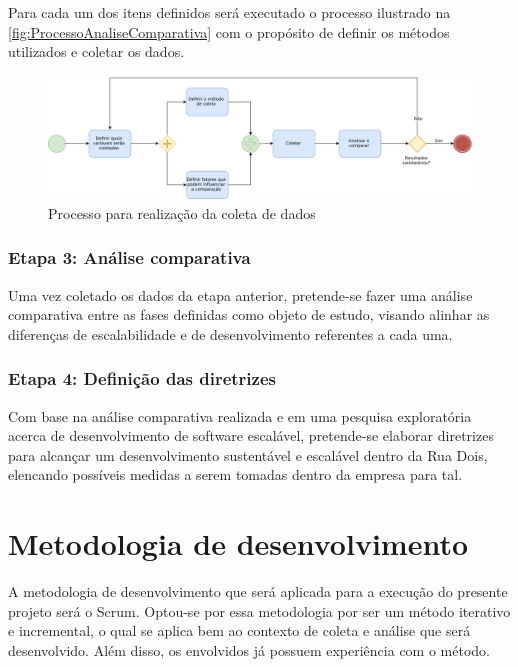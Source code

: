 Para cada um dos itens definidos será executado o processo ilustrado na
\autoref{fig:ProcessoAnaliseComparativa} com o propósito de definir os métodos utilizados
e coletar os dados.

    \begin{figure}[h]
      \caption{Processo para realização da coleta de dados\label{fig:ProcessoAnaliseComparativa}}
      \centering
      \includegraphics[keepaspectratio=true,scale=0.5]{figuras/metodologiaAnalise.eps}
    \end{figure}

\subsubsection{Etapa 3: Análise comparativa}

Uma vez coletado os dados da etapa anterior, pretende-se fazer uma análise comparativa
entre as fases definidas como objeto de estudo, visando alinhar as diferenças de
escalabilidade e de desenvolvimento referentes a cada uma.

\subsubsection{Etapa 4: Definição das diretrizes}

Com base na análise comparativa realizada e em uma pesquisa exploratória acerca de
desenvolvimento de software escalável, pretende-se elaborar diretrizes para alcançar
um desenvolvimento sustentável e escalável dentro da Rua Dois, elencando possíveis
medidas a serem tomadas dentro da empresa para tal.


\section{Metodologia de desenvolvimento}

A metodologia de desenvolvimento que será aplicada para a execução do presente
projeto será o Scrum. Optou-se por essa metodologia por ser um método iterativo
e incremental, o qual se aplica bem ao contexto de coleta e análise que será
desenvolvido. Além disso, os envolvidos já possuem experiência com o método.

